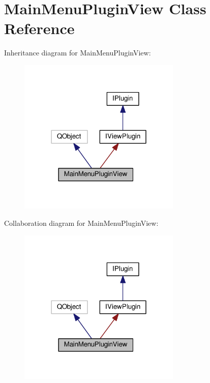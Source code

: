 \hypertarget{class_main_menu_plugin_view}{}\section{Main\+Menu\+Plugin\+View Class Reference}
\label{class_main_menu_plugin_view}


Inheritance diagram for Main\+Menu\+Plugin\+View\+:\nopagebreak
\begin{figure}[H]
\begin{center}
\leavevmode
\includegraphics[width=219pt]{class_main_menu_plugin_view__inherit__graph}
\end{center}
\end{figure}


Collaboration diagram for Main\+Menu\+Plugin\+View\+:\nopagebreak
\begin{figure}[H]
\begin{center}
\leavevmode
\includegraphics[width=219pt]{class_main_menu_plugin_view__coll__graph}
\end{center}
\end{figure}
